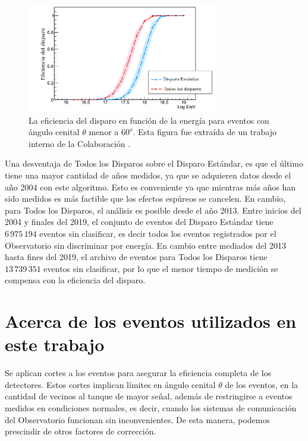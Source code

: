 \begin{figure}[H]
  \centering
  \includegraphics[width=0.75\textwidth]{comparacion_triggers.png}
  \caption{La eficiencia del disparo en función de la energía para eventos con ángulo cenital $\theta$ menor a $60^o$. Esta figura fue extraída de un trabajo interno de la Colaboración {\cite{triggers_ref}}.}
  \label{fig:triggers}
\end{figure}


Una desventaja de Todos los Disparos sobre el Disparo Estándar, es que el último tiene una mayor cantidad de años medidos, ya que se adquieren datos  desde el año 2004 con este algoritmo. Esto es conveniente ya que mientras más años han sido medidos es más factible que los efectos espúreos se cancelen. En cambio, para Todos los Disparos, el análisis  es posible desde el año 2013. Entre inicios del 2004 y finales del 2019, el conjunto de eventos del Disparo Estándar tiene $6\,975\,194$ eventos sin clasificar, es decir todos los eventos registrados por el Observatorio sin discriminar por energía. En cambio entre mediados del 2013 hasta fines del 2019, el archivo de eventos para Todos los Disparos tiene $13\,739\,351$ eventos sin clasificar, por lo que el menor tiempo de medición se compensa con la eficiencia del disparo.


\section{Acerca de los eventos utilizados en este trabajo} \label{filtro}

Se aplican cortes a los eventos para asegurar la eficiencia completa de los detectores. Estos cortes implican límites en ángulo cenital $\theta$ de los eventos, en la cantidad de vecinos al tanque de mayor señal, además de restringirse a eventos medidos en condiciones normales, es decir, cuando los sistemas de comunicación del Observatorio funcionan sin inconvenientes. De esta manera, podemos prescindir de otros factores de corrección.

